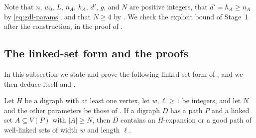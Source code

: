 \documentclass[fontsize=12pt,leading=14pt]{fullpaper}
\begin{document}
Note that $n$, $w_0$, $L$, $n_A$, $h_A$, $d'$, $g$, and $N$ are positive integers, that $d'=h_A\ge n_A$ by \eqref{eq:gdl-params}, and that $N\ge4$ by .
We check the explicit bound of Stage~1 after the construction, in the proof of .

\subsection{The linked-set form and the proofs}\label{sec:stage1-core}

In this subsection we state and prove the following linked-set form of , and we then deduce  itself and .

\begin{theorem}\label{thm:core}
  Let $H$ be a digraph with at least one vertex, let $w,\ell\ge1$ be integers, and let $N$ and the other parameters be those of .
  If a digraph $D$ has a path $P$ and a linked set $A\subseteq V(P)$ with $|A|\ge N$, then $D$ contains an $H$-expansion or a good path of well-linked sets of width $w$ and length $\ell$.
\end{theorem}
\end{document}
